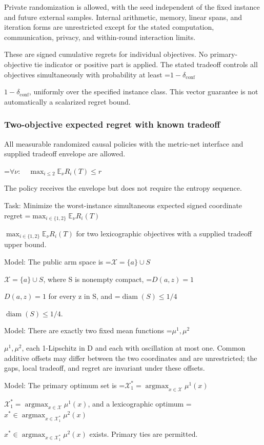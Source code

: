 \documentclass[10pt,a4paper]{article}
\newcommand{\AtlasMath}[1]{\par\begingroup\centering\setbox0=\hbox{$\displaystyle #1$}\ifdim\wd0>1.4\linewidth\typeout{ATLAS WIDE FORMULA: \the\wd0}\fi\ifdim\wd0>\linewidth\resizebox{\linewidth}{!}{\box0}\else\box0\fi\par\endgroup}
\newcommand{\AtlasInlineMath}[1]{\begingroup\setbox0=\hbox{$#1$}\ifdim\wd0>.4\linewidth\endgroup\AtlasMath{#1}\else\endgroup$#1$\fi}
\begin{document}
Private randomization is allowed, with the seed independent of the fixed instance and future external samples. Internal arithmetic, memory, linear spans, and iteration forms are unrestricted except for the stated computation, communication, privacy, and within-round interaction limits.



These are signed cumulative regrets for individual objectives. No primary-objective tie indicator or positive part is applied. The stated tradeoff controls all objectives simultaneously with probability at least \AtlasInlineMath{1-\delta_{\mathrm{conf}}}, uniformly over the specified instance class. This vector guarantee is not automatically a scalarized regret bound.



\subsubsection{Two-objective expected regret with known tradeoff}


All measurable randomized causal policies with the metric-net interface and supplied tradeoff envelope are allowed.




\AtlasMath{\forall\nu:\quad\max_{i\le2}\mathbb E_\nu R_i(T)\le r}




The policy receives the envelope but does not require the entropy sequence.



Task: Minimize the worst-instance simultaneous expected signed coordinate regret \AtlasInlineMath{\max_{i\in\{1,2\}}\mathbb E_\nu R_i(T)} for two lexicographic objectives with a supplied tradeoff upper bound.



Model: The public arm space is \AtlasInlineMath{\mathcal X=\{a\}\cup S}, where S is nonempty compact, \AtlasInlineMath{D(a,z)=1} for every z in S, and \AtlasInlineMath{\operatorname{diam}(S)\le1/4}.



Model: There are exactly two fixed mean functions \AtlasInlineMath{\mu^1,\mu^2}, each 1-Lipschitz in D and each with oscillation at most one. Common additive offsets may differ between the two coordinates and are unrestricted; the gaps, local tradeoff, and regret are invariant under these offsets.



Model: The primary optimum set is \AtlasInlineMath{\mathcal X_1^*=\operatorname{argmax}_{x\in\mathcal X}\mu^1(x)}, and a lexicographic optimum \AtlasInlineMath{x^*\in\operatorname{argmax}_{x\in\mathcal X_1^*}\mu^2(x)} exists. Primary ties are permitted.
\end{document}
